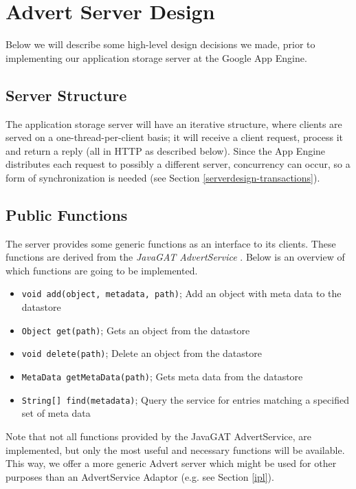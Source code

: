 \section{Advert Server Design}
\label{serverdesign}
Below we will describe some high-level design decisions we made, prior to
implementing our application storage server at the Google App Engine.

\subsection{Server Structure}
\label{serverdesign-structure}
The application storage server will have an iterative structure, where clients
are served on a one-thread-per-client basis; it will receive a client request,
process it and return a reply (all in HTTP as described below). Since the App
Engine distributes each request to possibly a different server, concurrency can
occur, so a form of synchronization is needed (see Section
\ref{serverdesign-transactions}).

\subsection{Public Functions}
\label{serverdesign-pub}
The server provides some generic functions as an interface to its clients. These
functions are derived from the \emph{JavaGAT AdvertService} \cite{javagat-www}. 
Below is an overview of which functions are going to be implemented.

\begin{itemize}
	\item \texttt{void add(object, metadata, path)}; Add an object with meta data to
		the datastore
	\item \texttt{Object get(path)}; Gets an object from the datastore
	\item \texttt{void delete(path)}; Delete an object from the datastore
	\item \texttt{MetaData getMetaData(path)}; Gets meta data from the datastore
	\item \texttt{String[] find(metadata)}; Query the service for entries matching
		a specified set of meta data 
\end{itemize}

Note that not all functions provided by the JavaGAT AdvertService, are
implemented, but only the most useful and necessary functions will be
available. This way, we offer a more generic Advert server which might be
used for other purposes than an AdvertService Adaptor (e.g. see Section
\ref{ipl}).

